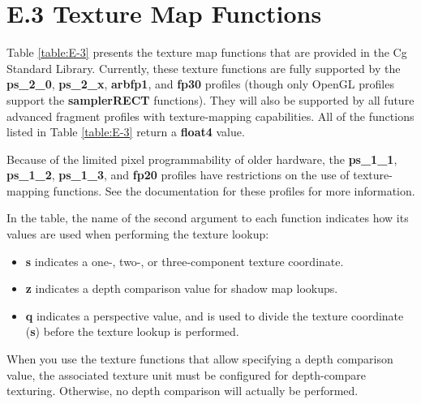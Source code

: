 \documentclass[../main.tex]{subfiles}
\begin{document}
\section{E.3 Texture Map Functions}

Table \ref{table:E-3} presents the texture map functions that are provided in the Cg Standard Library. Currently, these texture functions are fully supported by the \textbf{ps_2_0}, \textbf{ps_2_x}, \textbf{arbfp1}, and \textbf{fp30} profiles (though only OpenGL profiles support the \textbf{samplerRECT} functions). They will also be supported by all future advanced fragment profiles with texture-mapping capabilities. All of the functions listed in Table \ref{table:E-3} return a \textbf{float4} value.

Because of the limited pixel programmability of older hardware, the \textbf{ps_1_1}, \textbf{ps_1_2}, \textbf{ps_1_3}, and \textbf{fp20} profiles have restrictions on the use of texture-mapping functions. See the documentation for these profiles for more information.

In the table, the name of the second argument to each function indicates how its values are used when performing the texture lookup:
\begin{itemize}
\item \textbf{s} indicates a one-, two-, or three-component texture coordinate.
\item \textbf{z} indicates a depth comparison value for shadow map lookups.
\item \textbf{q} indicates a perspective value, and is used to divide the texture coordinate (\textbf{s}) before the texture lookup is performed.
\end{itemize}
When you use the texture functions that allow specifying a depth comparison value, the associated texture unit must be configured for depth-compare texturing. Otherwise, no depth comparison will actually be performed.
\end{document}
